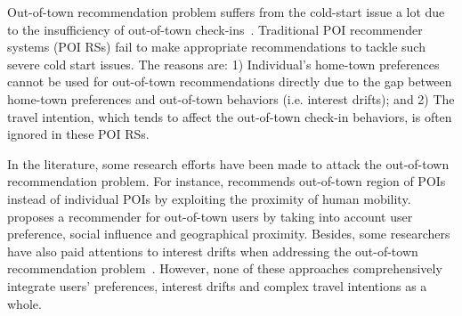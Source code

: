 \documentclass[letterpaper]{article} %
\begin{document}
% 
Out-of-town recommendation problem suffers from the cold-start issue a lot due to the insufficiency of out-of-town check-ins~\cite{ference2013location}.
Traditional POI recommender systems (POI RSs) fail to make appropriate recommendations to tackle such severe cold start issues.
The reasons are: 
1) Individual's home-town preferences cannot be used for out-of-town recommendations directly due to the gap between home-town preferences and out-of-town behaviors (i.e. interest drifts); 
and 2) The travel intention, which tends to affect the out-of-town check-in behaviors, is often ignored in these POI RSs. 

In the literature, some research efforts have been made to attack the out-of-town recommendation problem.
For instance, 
\cite{pham2017general} recommends out-of-town region of POIs instead of individual POIs by exploiting the proximity of human mobility. 
\cite{ference2013location} proposes a recommender for out-of-town users by taking into account user preference, social influence and geographical proximity.
Besides, some researchers have also paid attentions to interest drifts when addressing the out-of-town recommendation problem~\cite{yin2014lcars,yin2016joint,wang2017location}.
% 
However, none of these approaches comprehensively integrate users' preferences, interest drifts and complex travel intentions as a whole. 
\end{document}

